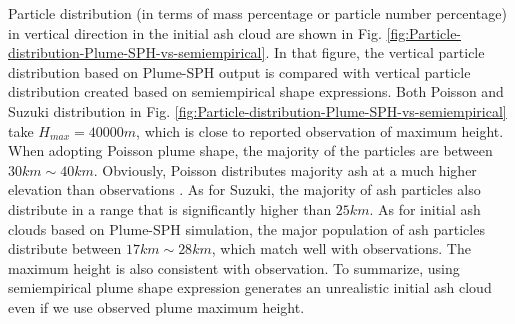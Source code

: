 \documentclass[draft,linenumbers]{agujournal2019}
\begin{document}
Particle distribution (in terms of mass percentage or particle number percentage) in vertical direction in the initial ash cloud are shown in Fig. \ref{fig:Particle-distribution-Plume-SPH-vs-semiempirical}. In that figure, the vertical particle distribution based on Plume-SPH output is compared with vertical particle distribution created based on semiempirical shape expressions. Both Poisson and Suzuki distribution in Fig. \ref{fig:Particle-distribution-Plume-SPH-vs-semiempirical} take $H_{max} = 40000m$, which is close to reported observation of maximum height. When adopting Poisson plume shape, the majority of the particles are between $30 km \sim 40 km$. Obviously, Poisson distributes majority ash at a much higher elevation than observations \citep[e.g.][]{fero2008simulation}. As for Suzuki, the majority of ash particles also distribute in a range that is significantly higher than $25 km$. As for initial ash clouds based on Plume-SPH simulation, the major population of ash particles distribute between $17 km \sim 28 km$, which match well with observations. The maximum height is also consistent with observation. To summarize, using semiempirical plume shape expression generates an unrealistic initial ash cloud even if we use observed plume maximum height.
\end{document}
